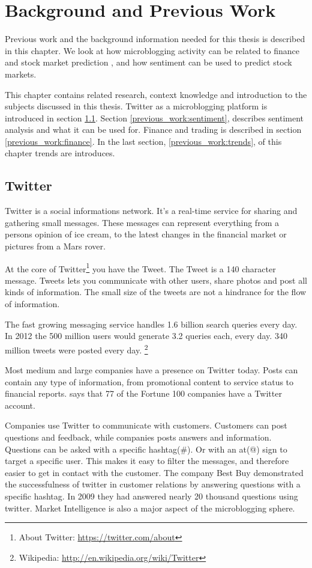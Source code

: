 \chapter{Background and Previous Work}\label{previous_work}
Previous work and the background information needed for this
thesis is described in this chapter. We look at how microblogging activity
can be related to finance and stock market prediction \cite{bollen2011}, and how
sentiment can be used to predict stock markets.

This chapter contains related research, context knowledge and introduction to
the subjects discussed in this thesis. Twitter as a microblogging platform is
introduced in section \ref{previous_work:twitter}. Section
\ref{previous_work:sentiment}, describes sentiment analysis and what it can be used for.
Finance and trading is described in section
\ref{previous_work:finance}. In the last section, \ref{previous_work:trends}, of
this chapter trends are introduces. 

\section{Twitter}\label{previous_work:twitter}
Twitter is a social informations network. 
It's a real-time service for sharing and gathering small messages. These
messages can represent everything from a persons opinion of ice cream, to the
latest changes in the financial market or pictures from a Mars rover. 

At the core of Twitter\footnote{About Twitter: \url{https://twitter.com/about}}
you have the Tweet. The Tweet is a 140 character message. 
Tweets lets you communicate with other users, share photos and post all kinds of
information. The small size of the tweets are not a hindrance for the flow of
information. 

The fast growing messaging service handles 1.6 billion search queries every day.
In 2012 the 500 million users would generate 3.2 queries each, every day. 340 million tweets were posted every day. 
\footnote{Wikipedia: \url{http://en.wikipedia.org/wiki/Twitter}} 

Most medium and large companies have a presence on Twitter today. Posts can contain
any type of information, from promotional content to service status to
financial reports. \cite[p8]{annikajubbega11:twitter_driver_stock_price} says
that 77 of the Fortune 100 companies have a Twitter account. 

Companies use Twitter to communicate with customers. Customers can post
questions and feedback, while companies posts answers and information.
Questions can be asked with a specific hashtag(\#). Or with an at(@) sign to target a
specific user. This makes it easy to filter the messages, and therefore easier
to get in contact with the customer. The company Best Buy demonstrated the successfulness of
twitter in customer relations by answering questions with a specific hashtag. In
2009 they had answered nearly 20 thousand questions using twitter.
\cite[p1]{Li2013206} Market Intelligence is also a major aspect of the
microblogging sphere.

